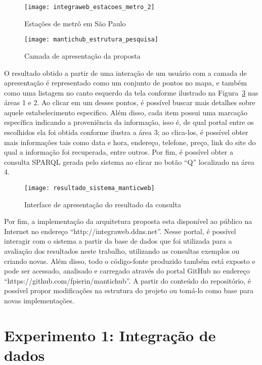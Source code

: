 \begin{figure}[!ht]
  \centering
  \texttt{[image: integraweb\_estacoes\_metro\_2]} 
  \caption{Estações de metrô em São Paulo}
  \label{fig:integraweb_estacoes_metro} 
\end{figure}

\begin{figure}[!ht]
  \centering
  \texttt{[image: mantichub\_estrutura\_pesquisa]} 
  \caption{Camada de apresentação da proposta}
  \label{fig:mantichub_sistema} 
\end{figure}


O resultado obtido a partir de uma interação de um usuário com a camada de apresentação é representado como um conjunto de pontos no mapa, e também como uma listagem no canto esquerdo da tela conforme ilustrado na Figura~\ref{fig:resultado_sistema_manticweb} nas áreas 1 e 2. Ao clicar em um desses pontos, é possível buscar mais detalhes sobre aquele estabelecimento especifico. Além disso, cada item possui uma marcação específica indicando a proveniência da informação, isso é, de qual portal entre os escolhidos ela foi obtida conforme ilustra a área 3; ao clica-los, é possível obter mais informações tais como data e hora, endereço, telefone, preço, link do site do qual a informação foi recuperada, entre outros. Por fim, é possível obter a consulta SPARQL gerada pelo sistema ao clicar no botão ``Q'' localizado na área 4.

\begin{figure}[!ht]
  \centering
  \texttt{[image: resultado\_sistema\_manticweb]} 
  \caption{Interface de apresentação do resultado da consulta}
  \label{fig:resultado_sistema_manticweb} 
\end{figure}

Por fim, a implementação da arquitetura proposta esta disponível ao público na Internet no endereço ``http://integraweb.ddns.net''. Nesse portal, é possível interagir com o sistema a partir da base de dados que foi utilizada para a avaliação dos resultados neste trabalho, utilizando as consultas exemplos ou criando novas. Além disso, todo o código-fonte produzido também está exposto e pode ser acessado, analisado e carregado através do portal GitHub no endereço ``https://github.com/fpierin/mantichub''. A partir do conteúdo do repositório, é possível propor modificações na estrutura do projeto ou tomá-lo como base para novas implementações.

\section{Experimento 1: Integração de dados}
\label{sec:experimento_integracao_heterogenea}

